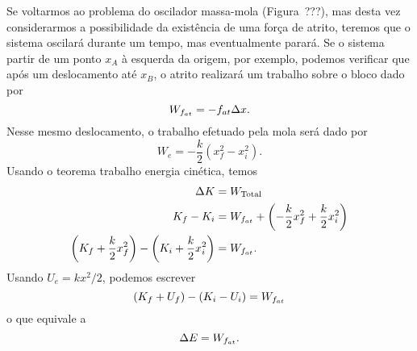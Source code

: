 



Se voltarmos ao problema do oscilador massa-mola (Figura~???), mas desta vez considerarmos a possibilidade da existência de uma força de atrito, teremos que o sistema oscilará durante um tempo, mas eventualmente parará. Se o sistema partir de um ponto $x_A$ à esquerda da origem, por exemplo, podemos verificar que após um deslocamento até $x_B$, o atrito realizará um trabalho sobre o bloco dado por
\begin{equation}
  W_{f_{at}} = - f_{at} \Delta x.
\end{equation}
%
Nesse mesmo deslocamento, o trabalho efetuado pela mola será dado por
\begin{equation}
  W_e = -\frac{k}{2}(x_f^2 - x_i^2).
\end{equation}
%
Usando o teorema trabalho energia cinética, temos
\begin{align}
  \Delta K &= W_{\textrm{Total}} \\
  K_f - K_i &= W_{f_{at}} + \left(-\frac{k}{2}x_f^2 + \frac{k}{2}x_i^2\right) \\
  \left(K_f + \frac{k}{2} x_f^2\right) - \left(K_i + \frac{k}{2}x_i^2\right) &= W_{f_{at}}.
\end{align}
%
Usando $U_e = kx^2/2$, podemos escrever
\begin{equation}
  (K_f + U_f) - (K_i - U_i) = W_{f_{at}}
\end{equation}
%
o que equivale a
\begin{equation}
  \Delta E = W_{f_{at}}.
\end{equation}

